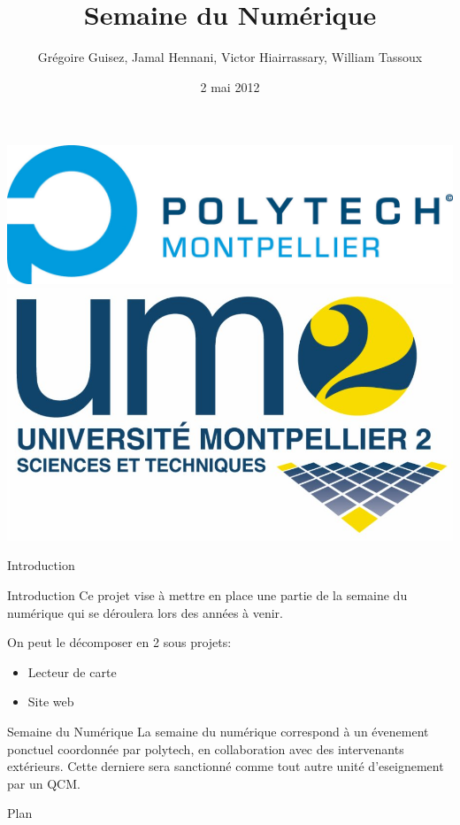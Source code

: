 \documentclass[handout]{beamer}
\title{Semaine du Numérique}
\author[G. Guisez, J. Hennani, V. Hiairrassary, W. Tassoux]{Grégoire Guisez, Jamal Hennani, Victor Hiairrassary, William Tassoux}
\institute{Polytech' Montpellier, Université Montpellier 2}
\date{2 mai 2012}
\begin{document}
\small 



\begin{frame}
    \titlepage

    \includegraphics[scale=0.2]{images/logoPolytech.jpg}
    \hfill
    \hskip8pt
    \includegraphics[scale=0.05]{images/logoUm2.jpg}
\end{frame}


\begin{frame}{Introduction}
    \begin{block}{Introduction}
 		 Ce projet vise à mettre en place une partie de la semaine du numérique qui se déroulera lors des années à venir.

		 On peut le décomposer en 2 sous projets:
		\begin{itemize}
			\item Lecteur de carte
			\item Site web
		\end{itemize}
	\end{block}

	\begin{block}{Semaine du Numérique}
	    La semaine du numérique correspond à un évenement ponctuel coordonnée 
    par polytech, en collaboration avec des intervenants extérieurs. Cette 
    derniere sera sanctionné comme tout autre unité d'eseignement par un QCM.
	\end{block}	
\end{frame}


\begin{frame}{Plan}
 	\tableofcontents
\end{frame}




\end{document}

